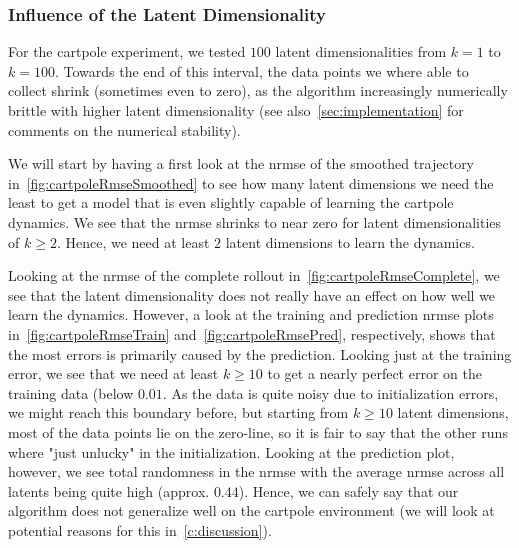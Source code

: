 		\subsubsection{Influence of the Latent Dimensionality}
			For the cartpole experiment, we tested \(100\) latent dimensionalities from \( k = 1 \) to \( k = 100 \). Towards the end of this interval, the data points we where able to collect shrink (sometimes even to zero), as the algorithm increasingly numerically brittle with higher latent dimensionality (see also~\autoref{sec:implementation} for comments on the numerical stability).

			We will start by having a first look at the \ac{nrmse} of the smoothed trajectory in~\autoref{fig:cartpoleRmseSmoothed} to see how many latent dimensions we need the least to get a model that is even slightly capable of learning the cartpole dynamics. We see that the \ac{nrmse} shrinks to near zero for latent dimensionalities of \( k \geq 2 \). Hence, we need at least \(2\) latent dimensions to learn the dynamics.

			Looking at the \ac{nrmse} of the complete rollout in~\autoref{fig:cartpoleRmseComplete}, we see that the latent dimensionality does not really have an effect on how well we learn the dynamics. However, a look at the training and prediction \ac{nrmse} plots in~\autoref{fig:cartpoleRmseTrain} and~\autoref{fig:cartpoleRmsePred}, respectively, shows that the most errors is primarily caused by the prediction. Looking just at the training error, we see that we need at least \( k \geq 10 \) to get a nearly perfect error on the training data (below \(0.01\). As the data is quite noisy due to initialization errors, we might reach this boundary before, but starting from \(k \geq 10\) latent dimensions, most of the data points lie on the zero-line, so it is fair to say that the other runs where "just unlucky" in the initialization. Looking at the prediction plot, however, we see total randomness in the \ac{nrmse} with the average \ac{nrmse} across all latents being quite high (approx. \(0.44\)). Hence, we can safely say that our algorithm does not generalize well on the cartpole environment (we will look at potential reasons for this in~\autoref{c:discussion}).


